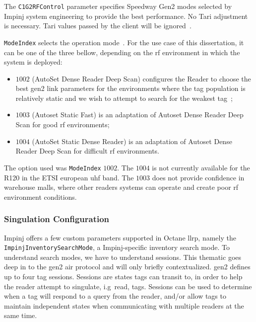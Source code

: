 The \texttt{C1G2RFControl} parameter specifies Speedway Gen2 modes selected by Impinj system engineering to provide the best performance. No Tari adjustment is necessary. Tari values passed by the client will be ignored~\cite{ImpinjOctaneLLRP}.

\texttt{ModeIndex} selects the operation mode~\cite{ReaderModesMade, ImpinjOctaneLLRP}. For the use case of this dissertation, it can be one of the three bellow, depending on the \ac{rf} environment in which the system is deployed: 

\begin{itemize}
    \item $1002$ (AutoSet Dense Reader Deep Scan) configures the Reader to choose the best \ac{gen2} link parameters for the environments where the tag population is relatively static and we wish to attempt to search for the weakest tag~\cite{ReaderMode1002};
    \item $1003$ (Autoset Static Fast) is an adaptation of Autoset Dense Reader Deep Scan for good \ac{rf} environments;
    \item $1004$ (AutoSet Static Dense Reader) is an adaptation of Autoset Dense Reader Deep Scan for difficult \ac{rf} environments.
\end{itemize}

The option used was \texttt{ModeIndex} $1002$. The $1004$ is not currently available for the R120 in the ETSI european \ac{uhf} band. The $1003$ does not provide confidence in warehouse malls, where other readers systems can operate and create poor \ac{rf} environment conditions.

\subsubsection{Singulation Configuration}

Impinj offers a few custom parameters supported in Octane \ac{llrp}, namely the \texttt{ImpinjInventorySearchMode}, a Impinj-specific inventory search mode. 
To understand search modes, we have to understand sessions. This thematic goes deep in to the \ac{gen2} air protocol and will only briefly contextualized. \ac{gen2} defines up to four tag sessions. Sessions are states tags can transit to, in order to help the reader attempt to singulate, i.g\ read, tags.
Sessions can be used to determine when a tag will respond to a query from the reader, and/or allow tags to maintain independent states when communicating with multiple readers at the same time. 

